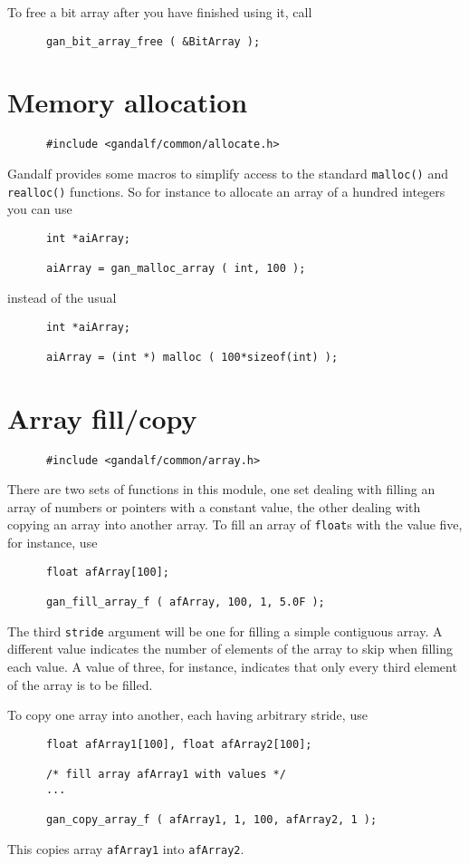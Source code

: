 To free a bit array after you have finished using it, call
\begin{verbatim}
      gan_bit_array_free ( &BitArray );
\end{verbatim}

\section{Memory allocation} \label{allocation-sec}
\begin{verbatim}
      #include <gandalf/common/allocate.h>
\end{verbatim}
Gandalf provides some macros to simplify access to the standard {\tt malloc()}
and {\tt realloc()} functions. So for instance to allocate an array of
a hundred integers you can use
\begin{verbatim}
      int *aiArray;

      aiArray = gan_malloc_array ( int, 100 );
\end{verbatim}
instead of the usual
\begin{verbatim}
      int *aiArray;

      aiArray = (int *) malloc ( 100*sizeof(int) );
\end{verbatim}

\section{Array fill/copy} \label{array-sec}
\begin{verbatim}
      #include <gandalf/common/array.h>
\end{verbatim}
There are two sets of functions in this module, one set dealing with
filling an array of numbers or pointers with a constant value, the other
dealing with copying an array into another array. To fill an array of
{\tt float}s with the value five, for instance, use
\begin{verbatim}
      float afArray[100];

      gan_fill_array_f ( afArray, 100, 1, 5.0F );
\end{verbatim}
The third {\tt stride} argument will be one for filling a simple contiguous
array. A different value indicates the number of elements of the array to
skip when filling each value. A value of three, for instance, indicates that
only every third element of the array is to be filled.

To copy one array into another, each having arbitrary stride, use
\begin{verbatim}
      float afArray1[100], float afArray2[100];

      /* fill array afArray1 with values */
      ...

      gan_copy_array_f ( afArray1, 1, 100, afArray2, 1 );
\end{verbatim}
This copies array {\tt afArray1} into {\tt afArray2}.

